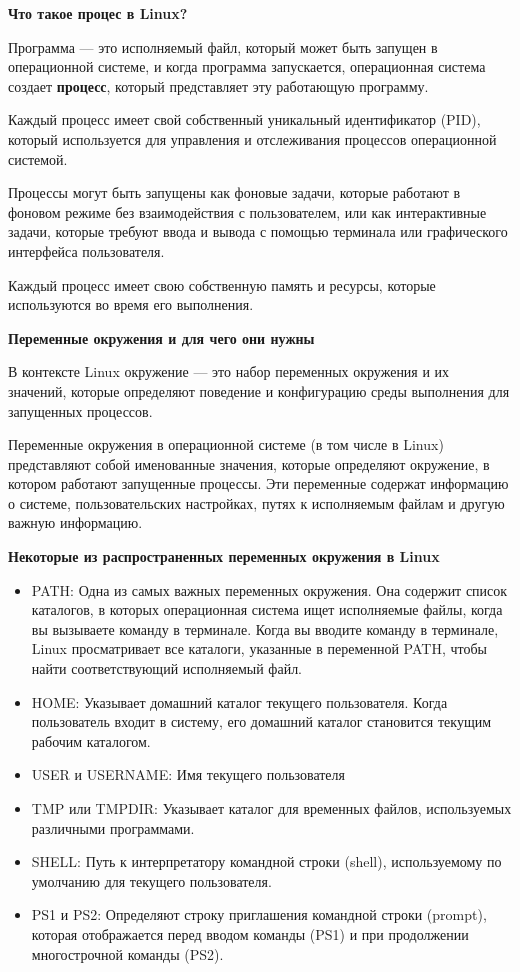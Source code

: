 \documentclass[oneside, final, 14pt]{extreport} %
\begin{document}
\textbf{Что такое процес в Linux?}

Программа --- это исполняемый файл, который может быть запущен в операционной системе, и когда программа запускается, операционная система создает \textbf{процесс}, который представляет эту работающую программу.

Каждый процесс имеет свой собственный уникальный идентификатор (PID), который используется для управления и отслеживания процессов операционной системой.

Процессы могут быть запущены как фоновые задачи, которые работают в фоновом режиме без взаимодействия с пользователем, или как интерактивные задачи, которые требуют ввода и вывода с помощью терминала или графического интерфейса пользователя.

Каждый процесс имеет свою собственную память и ресурсы, которые используются во время его выполнения.

\vspace*{\baselineskip}

\textbf{Переменные окружения и для чего они нужны}


В контексте Linux окружение --- это набор переменных окружения и их значений, которые определяют поведение и конфигурацию среды выполнения для запущенных процессов. 

Переменные окружения в операционной системе (в том числе в Linux) представляют собой именованные значения, которые определяют окружение, в котором работают запущенные процессы. Эти переменные содержат информацию о системе, пользовательских настройках, путях к исполняемым файлам и другую важную информацию.

\vspace{\baselineskip}

\textbf{Некоторые из распространенных переменных окружения в Linux }

\begin{itemize}
    \item PATH: Одна из самых важных переменных окружения. Она содержит список каталогов, в которых операционная система ищет исполняемые файлы, когда вы вызываете команду в терминале. Когда вы вводите команду в терминале, Linux просматривает все каталоги, указанные в переменной PATH, чтобы найти соответствующий исполняемый файл.
    \item HOME: Указывает домашний каталог текущего пользователя. Когда пользователь входит в систему, его домашний каталог становится текущим рабочим каталогом.
    \item USER и USERNAME: Имя текущего пользователя
    \item TMP или TMPDIR: Указывает каталог для временных файлов, используемых различными программами.
    \item SHELL: Путь к интерпретатору командной строки (shell), используемому по умолчанию для текущего пользователя.
    \item PS1 и PS2: Определяют строку приглашения командной строки (prompt), которая отображается перед вводом команды (PS1) и при продолжении многострочной команды (PS2).
\end{itemize}
\end{document}
